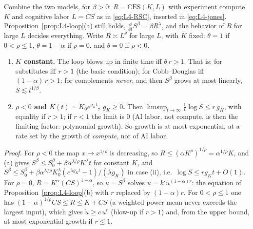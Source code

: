 \begin{beyond}\label{box:L4-bottleneck}
Combine the two models, for $\beta>0$: $R=\mathrm{CES}(K,L)$ with experiment compute $K$ and cognitive labor $L=CS$ as in \eqref{eq:L4-RSC}, inserted in \eqref{eq:L4-jones}. Proposition~\ref{prop:L4-loop}(a) still holds, $\frac{\dd}{\dd t}S^\beta=\beta R^\lambda$, and the behavior of $R$ for large $L$ decides everything. Write $R\asymp L^{\theta}$ for large $L$, with $K$ fixed: $\theta=1$ if $0<\rho\le1$, $\theta=1-\alpha$ if $\rho=0$, and $\theta=0$ if $\rho<0$.
\begin{enumerate}[label=(\roman*)]
  \item \textbf{$K$ constant.} The loop blows up in finite time iff $\theta\,r>1$. That is: for substitutes iff $r>1$ (the basic condition); for Cobb--Douglas iff $(1-\alpha)\,r>1$; for complements \emph{never}, and then $S^\beta$ grows at most linearly, $S\lesssim t^{1/\beta}$.
  \item \textbf{$\rho<0$ and $K(t)=K_0e^{g_Kt}$, $g_K\ge0$.} Then $\limsup_{t\to\infty}\frac1t\log S\le r\,g_K$, with equality if $r>1$; if $r<1$ the limit is $0$ (AI labor, not compute, is then the limiting factor: polynomial growth). So growth is at most exponential, at a rate set by the growth of \emph{compute}, not of AI labor.
\end{enumerate}
\emph{Proof.} For $\rho<0$ the map $x\mapsto x^{1/\rho}$ is decreasing, so $R\le(\alpha K^{\rho})^{1/\rho}=\alpha^{1/\rho}K$, and (a) gives $S^{\beta}\le S_0^\beta+\beta\alpha^{\lambda/\rho}K^\lambda t$ for constant $K$, and $S^\beta\le S_0^\beta+\beta\alpha^{\lambda/\rho}K_0^\lambda(e^{\lambda g_Kt}-1)/(\lambda g_K)$ in case (ii), i.e.\ $\log S\le r g_Kt+O(1)$. For $\rho=0$, $R=K^\alpha(CS)^{1-\alpha}$, so $u=S^\beta$ solves $\dot u=k'u^{(1-\alpha)r}$: the equation of Proposition~\ref{prop:L4-loop}(b) with $r$ replaced by $(1-\alpha)r$. For $0<\rho\le1$ one has $(1-\alpha)^{1/\rho}CS\le R\le K+CS$ (a weighted power mean never exceeds the largest input), which gives $\dot u\ge c\,u^{r}$ (blow-up if $r>1$) and, from the upper bound, at most exponential growth if $r\le1$.


\end{beyond}
